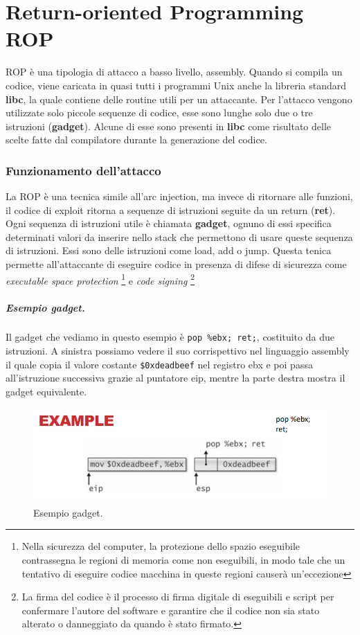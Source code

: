 
\chapter{Return-oriented Programming ROP}
ROP è una tipologia di attacco a basso livello, assembly. Quando si compila un codice, viene caricata in quasi tutti i programmi Unix anche la libreria standard \textbf{libc}, la quale contiene delle routine utili per un attaccante. Per l'attacco vengono utilizzate solo piccole sequenze di codice, esse sono lunghe solo due o tre istruzioni (\textbf{gadget}). Alcune di esse sono presenti in \textbf{libc} come risultato delle scelte fatte dal compilatore durante la generazione del codice.

\subsection{Funzionamento dell'attacco}
La ROP è una tecnica simile all'arc injection, ma invece di ritornare alle funzioni, il codice di exploit ritorna a sequenze di istruzioni seguite da un return (\textbf{ret}).
Ogni sequenza di istruzioni utile è chiamata \textbf{gadget},
ognuno di essi specifica determinati valori da inserire nello stack che permettono di usare queste sequenza di istruzioni.
Essi sono delle istruzioni come load, add o jump. Questa tenica permette all'attaccante di eseguire codice in presenza di difese di sicurezza
come \textit{executable space protection}
\footnote{ Nella sicurezza del computer, la protezione dello spazio eseguibile contrassegna le regioni di memoria come non eseguibili,
    in modo tale che un tentativo di eseguire codice macchina in queste regioni causerà un'eccezione} e \textit{code signing}
\footnote{La firma del codice è il processo di firma digitale di eseguibili e script per confermare l'autore del software e garantire che
    il codice non sia stato alterato o danneggiato da quando è stato firmato.}

\paragraph{Esempio gadget.} Il gadget che vediamo in questo esempio è \verb|pop %ebx; ret;|, costituito da due istruzioni. A sinistra possiamo vedere il suo corrispettivo nel linguaggio assembly il quale copia il valore costante \verb|$0xdeadbeef| nel registro ebx e poi passa all'istruzione successiva grazie al puntatore eip, mentre la parte destra mostra il gadget equivalente.

\begin{figure}[H]
    \centering
    \includegraphics[width=13cm, keepaspectratio]{capitoli/secure_coding/img/cap_3/es_gadget.png}
    \caption{Esempio gadget.}\label{fig:es_gadget}
\end{figure}

